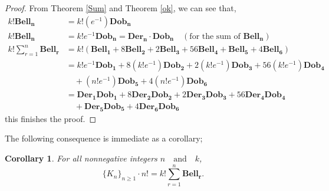 \documentclass[pdflatex,sn-mathphys-num]{sn-jnl}%
\newtheorem{corollary}{Corollary}
\theoremstyle{thmstyleone}%
\theoremstyle{thmstyletwo}%
\theoremstyle{thmstylethree}%
\begin{document}
\begin{proof}
From Theorem \ref{Sum} and Theorem \ref{ok}, we can see that,
\begin{align*}
k! \mathbf{Bell_n}&= k!(e^{-1})\mathbf{Dob_n}\\
k! \mathbf{Bell_n}&= k! e^{-1}\mathbf{Dob_n} = \mathbf{Der_n}\cdotp \mathbf{Dob_n}\quad (\mbox{for the sum of $\mathbf{Bell_n}$})\\
   k! \sum_{r=1}^{n} \mathbf{Bell_r}&=k!\left(\mathbf{Bell_1}+ 8 \mathbf{Bell_2}  + 2 \mathbf{Bell_3} + 56\mathbf{Bell_4} + \mathbf{Bell_5} + 4\mathbf{Bell_6} \right)\\
&= k!e^{-1}\mathbf{Dob_1} + 8(k!e^{-1})\mathbf{Dob_2} + 2(k!e^{-1})\mathbf{Dob_3} + 56(k!e^{-1})\mathbf{Dob_4}\\ \nonumber
 & \quad + (n!e^{-1})\mathbf{Dob_5}+ 4(n!e^{-1})\mathbf{Dob_6}\\
&= \mathbf{Der_1} \mathbf{Dob_1} + 8\mathbf{Der_2} \mathbf{Dob_2} + 2 \mathbf{Der_3} \mathbf{Dob_3} +56 \mathbf{Der_4} \mathbf{Dob_4}\\
 &\quad+ \mathbf{Der_5} \mathbf{Dob_5}+ 4 \mathbf{Der_6} \mathbf{Dob_6}
    \end{align*}
this finishes the proof.    
\end{proof}
The following consequence is immediate as a corollary;
\begin{corollary}
    For all nonnegative integers $n\quad\mbox{and}\quad k$,
    $$\lbrace K_n\rbrace_{n\geq 1} \cdotp n!=k! \sum_{r=1}^{n}\mathbf{Bell_r}.$$
\end{corollary}
\end{document}
